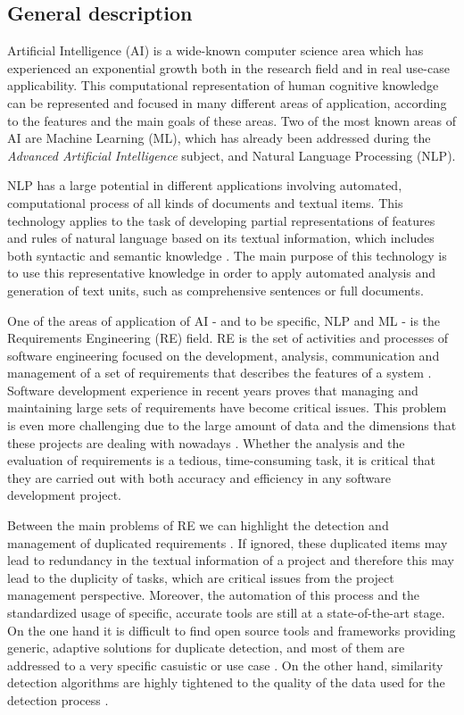 \documentclass[a4paper]{article}
\begin{document}
\subsection{General description}
\label{sec:general_introduction}

Artificial Intelligence (AI) is a wide-known computer science area which has experienced an exponential growth both in the research field and in real use-case applicability. This computational representation of human cognitive knowledge can be represented and focused in many different areas of application, according to the features and the main goals of these areas. Two of the most known areas of AI are Machine Learning (ML), which has already been addressed during the \textit{Advanced Artificial Intelligence} subject, and Natural Language Processing (NLP).

NLP has a large potential in different applications involving automated, computational process of all kinds of documents and textual items. This technology applies to the task of developing partial representations of features and rules of natural language based on its textual information, which includes both syntactic and semantic knowledge \cite{b1}.  The main purpose of this technology is to use this representative knowledge in order to apply automated analysis and generation of text units, such as comprehensive sentences or full documents.

One of the areas of application of AI - and to be specific, NLP and ML - is the Requirements Engineering (RE) field. RE is the set of activities and processes of software engineering focused on the development, analysis, communication and management of a set of requirements that describes the features of a system \cite{b2}. Software development experience in recent years proves that managing and maintaining large sets of requirements have become critical issues. This problem is even more challenging due to the large amount of data and the dimensions that these projects are dealing with nowadays \cite{b3}. Whether the analysis and the evaluation of requirements is a tedious, time-consuming task,  it is critical that they are carried out with both accuracy and efficiency in any software development project.

Between the main problems of RE we can highlight the detection and management of duplicated requirements \cite{b4}. If ignored, these duplicated items may lead to redundancy in the textual information of a project and therefore this may lead to the duplicity of tasks, which are critical issues from the project management perspective. Moreover, the automation of this process and the standardized usage of specific, accurate tools are still at a state-of-the-art stage. On the one hand it is difficult to find open source tools and frameworks providing generic, adaptive solutions for duplicate detection, and most of them are addressed to a very specific casuistic or use case \cite{b5}. On the other hand, similarity detection algorithms are highly tightened to the quality of the data used for the detection process \cite{b6}.
\end{document}
